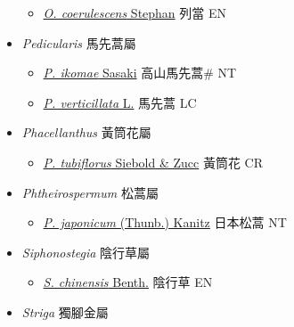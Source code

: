 \begin{itemize}
  \begin{itemize}
        \item[] \href{http://www.theplantlist.org/tpl1.1/search?q=Orobanche+coerulescens}{\textit{O. coerulescens} Stephan}   列當 EN
  \end{itemize}
 \item[] \textit{Pedicularis} 馬先蒿屬
                    
  \begin{itemize}
        \item[] \href{http://www.theplantlist.org/tpl1.1/search?q=Pedicularis+ikomae}{\textit{P. ikomae} Sasaki}   高山馬先蒿\# NT
        \item[] \href{http://www.theplantlist.org/tpl1.1/search?q=Pedicularis+verticillata}{\textit{P. verticillata} L.}   馬先蒿 LC
  \end{itemize}
 \item[] \textit{Phacellanthus} 黃筒花屬
                    
  \begin{itemize}
        \item[] \href{http://www.theplantlist.org/tpl1.1/search?q=Phacellanthus+tubiflorus}{\textit{P. tubiflorus} Siebold \& Zucc}   黃筒花 CR
  \end{itemize}
 \item[] \textit{Phtheirospermum} 松蒿屬
                    
  \begin{itemize}
        \item[] \href{http://www.theplantlist.org/tpl1.1/search?q=Phtheirospermum+japonicum}{\textit{P. japonicum} (Thunb.) Kanitz}   日本松蒿 NT
  \end{itemize}
 \item[] \textit{Siphonostegia} 陰行草屬
                    
  \begin{itemize}
        \item[] \href{http://www.theplantlist.org/tpl1.1/search?q=Siphonostegia+chinensis}{\textit{S. chinensis} Benth.}   陰行草 EN
  \end{itemize}
 \item[] \textit{Striga} 獨腳金屬
                    

\end{itemize}
